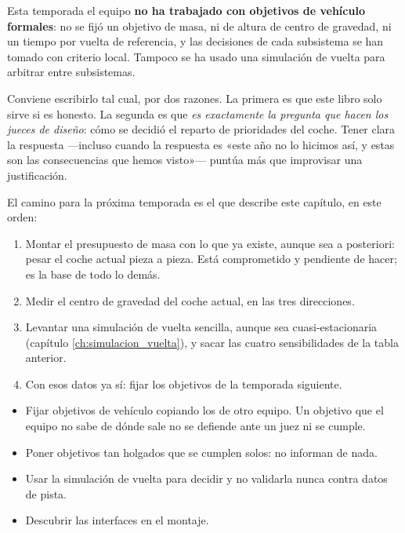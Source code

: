 \begin{caso}
Esta temporada el equipo \textbf{no ha trabajado con objetivos de vehículo
formales}: no se fijó un objetivo de masa, ni de altura de centro de gravedad, ni
un tiempo por vuelta de referencia, y las decisiones de cada subsistema se han
tomado con criterio local. Tampoco se ha usado una simulación de vuelta para
arbitrar entre subsistemas.

Conviene escribirlo tal cual, por dos razones. La primera es que este libro solo
sirve si es honesto. La segunda es que \emph{es exactamente la pregunta que hacen
los jueces de diseño}: cómo se decidió el reparto de prioridades del coche. Tener
clara la respuesta ---incluso cuando la respuesta es «este año no lo hicimos
así, y estas son las consecuencias que hemos visto»--- puntúa más que improvisar
una justificación.

El camino para la próxima temporada es el que describe este capítulo, en este orden:

\begin{enumerate}
  \item Montar el presupuesto de masa con lo que ya existe, aunque sea a
        posteriori: pesar el coche actual pieza a pieza. Está comprometido y
        pendiente de hacer; es la base de todo lo demás.
  \item Medir el centro de gravedad del coche actual, en las tres direcciones.
  \item Levantar una simulación de vuelta sencilla, aunque sea cuasi-estacionaria
        (capítulo \ref{ch:simulacion_vuelta}), y sacar las cuatro sensibilidades
        de la tabla anterior.
  \item Con esos datos ya sí: fijar los objetivos de la temporada siguiente.
\end{enumerate}

\end{caso}

\begin{ojo}
\begin{itemize}
  \item Fijar objetivos de vehículo copiando los de otro equipo. Un objetivo que
        el equipo no sabe de dónde sale no se defiende ante un juez ni se cumple.
  \item Poner objetivos tan holgados que se cumplen solos: no informan de nada.
  \item Usar la simulación de vuelta para decidir y no validarla nunca contra
        datos de pista.
  \item Descubrir las interfaces en el montaje.
\end{itemize}
\end{ojo}

